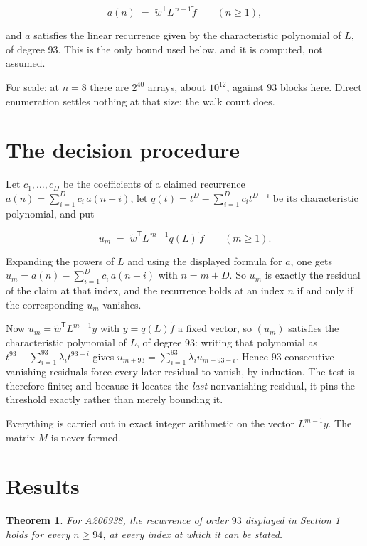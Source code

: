 \documentclass[11pt]{article}
\newtheorem{theorem}{Theorem}
\theoremstyle{definition}
\begin{document}
\[a(n) \;=\; \tilde w^{\mathsf T} L^{\,n-1} \tilde f \qquad (n \ge 1),\]

and $a$ satisfies the linear recurrence given by the characteristic polynomial of $L$, of degree $93$. This is the only bound used below, and it is computed, not assumed.

For scale: at $n = 8$ there are $2^{40}$ arrays, about $10^{12}$, against $93$ blocks here. Direct enumeration settles nothing at that size; the walk count does.

\section{The decision procedure}

Let $c_1,\dots,c_D$ be the coefficients of a claimed recurrence $a(n) = \sum_{i=1}^{D} c_i\,a(n-i)$, let $q(t) = t^{D} - \sum_{i=1}^{D} c_i t^{D-i}$ be its characteristic polynomial, and put

\[u_m \;=\; \tilde w^{\mathsf T} L^{\,m-1} q(L)\,\tilde f \qquad (m \ge 1).\]

Expanding the powers of $L$ and using the displayed formula for $a$, one gets $u_m = a(n) - \sum_{i=1}^{D} c_i\,a(n-i)$ with $n = m + D$. So $u_m$ is exactly the residual of the claim at that index, and the recurrence holds at an index $n$ if and only if the corresponding $u_m$ vanishes.

Now $u_m = \tilde w^{\mathsf T} L^{m-1} y$ with $y = q(L)\tilde f$ a fixed vector, so $(u_m)$ satisfies the characteristic polynomial of $L$, of degree $93$: writing that polynomial as $t^{93} - \sum_{i=1}^{93} \lambda_i t^{93-i}$ gives $u_{m+93} = \sum_{i=1}^{93} \lambda_i u_{m+93-i}$. Hence $93$ consecutive vanishing residuals force every later residual to vanish, by induction. The test is therefore finite; and because it locates the {\itshape last} nonvanishing residual, it pins the threshold exactly rather than merely bounding it.

Everything is carried out in exact integer arithmetic on the vector $L^{m-1}y$. The matrix $M$ is never formed.

\section{Results}

\begin{theorem} For A206938, the recurrence of order $93$ displayed in Section 1 holds for every $n \ge 94$, at every index at which it can be stated.\end{theorem}
\end{document}

